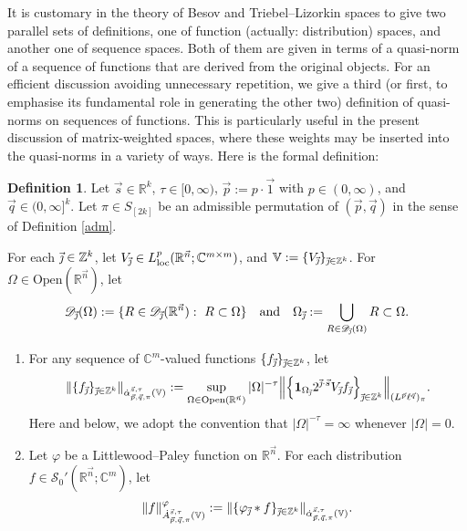 \documentclass[11pt, reqno]{amsart}
\theoremstyle{definition}
\newtheorem{definition}[theorem]{Definition}
\theoremstyle{remark}
\numberwithin{equation}{section}
\newcommand{\C}{\mathbb C}
\newcommand{\D}{\mathscr D}
\newcommand{\R}{\mathbb R}
\newcommand{\Sc}{\mathscr S}
\newcommand{\V}{\mathbb V}
\newcommand{\Z}{\mathbb Z}
\newcommand{\vone}{\vec 1}
\newcommand{\vj}{\vec{\textit{\j}}}
\newcommand{\vn}{\vec n}
\newcommand{\vp}{\vec p}
\newcommand{\vq}{\vec q}
\newcommand{\vs}{\vec s}
\newcommand{\Atau}{\dot A^{\vs,\tau}_{\vp,\vq,\pi}}
\newcommand{\aatau}{\dot{\alpha}^{\vs,\tau}_{\vp,\vq,\pi}}
\newcommand{\one}{\mathbf{1}}
\newcommand{\loc}{\mathrm{loc}}
\newcommand{\Norm}[2]{\|#1\|_{#2}}
\newcommand{\Open}{\mathrm{Open}}
\begin{document}
It is customary in the theory of Besov and Triebel--Lizorkin spaces to give two parallel sets of definitions, one of function
(actually: distribution) spaces, and another one of sequence spaces. Both of them are given in terms of a quasi-norm of a
sequence of functions that are derived from the original objects. For an efficient discussion avoiding unnecessary repetition, we give a third (or first, to emphasise its fundamental
role in generating the other two) definition of quasi-norms on sequences of functions. This is particularly useful in the present discussion of matrix-weighted spaces, where these weights may be
inserted into the quasi-norms in a variety of ways. Here is the formal definition:

\begin{definition}\label{d3.1}
Let $\vs\in\R^k$, $\tau\in[0,\infty)$, $\vp:=p\cdot\vone$ with $p\in(0,\infty)$, and $\vq\in(0,\infty]^k$.
Let $\pi \in S_{[2k]}$ be an admissible permutation of $(\vp,\vq)$ in the sense of Definition \ref{adm}.

For each $\vj\in\Z^k$, let $V_{\vj}\in L_{\loc}^p(\R^{\vec n};\C^{m\times m})$, and $\V:=\{V_{\vj}\}_{\vj\in\Z^k}$.
For $\Omega\in\Open(\R^{\vn})$, let
\begin{equation*}
\D_{\vj}(\Omega):=\{R\in\D_{\vj}(\R^{\vn}):\ R\subset\Omega\}
\quad \text{and}\quad
\Omega_{\vj}:=\bigcup_{R\in\D_{\vj}(\Omega)}R\subset\Omega.
\end{equation*}
\begin{enumerate}[\rm(i)]
\item For any sequence of $\C^m$-valued functions $\{f_{\vj}\}_{\vj\in\Z^k}$, let
\begin{equation}\label{general}
\Norm{\{f_{\vj}\}_{\vj\in\Z^k}}{\aatau(\V)}:=\sup_{\Omega\in\Open(\R^{\vn})}|\Omega|^{-\tau}
\Big\|\Big\{\one_{\Omega_{\vj}}2^{\vj\cdot\vs}V_{\vj}f_{\vj}\Big\}_{\vj\in\Z^k}
\Big\|_{(L^{\vp}\ell^{\vq})_{\pi}}.
\end{equation}
Here and below, we adopt the convention that
$|\Omega|^{-\tau}=\infty$ whenever $|\Omega|=0$.

\item Let $\varphi$ be a Littlewood--Paley function on $\R^{\vn}$.
For each distribution $f\in\Sc_{0}'(\R^{\vn};\C^m)$, let
\begin{equation*}
\Norm{f}{\Atau(\mathbb V)}^\varphi :=\Norm{\{\varphi_{\vj}*f\}_{\vj\in\Z^k}}{\aatau(\V)}.
\end{equation*}


\end{enumerate}
\end{definition}
\end{document}
